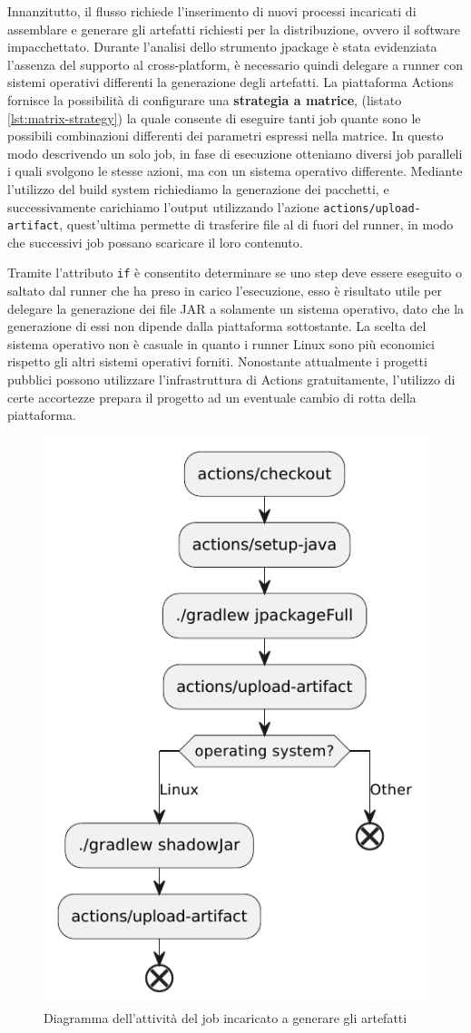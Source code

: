 Innanzitutto, il flusso richiede l'inserimento di nuovi processi incaricati di assemblare e generare gli artefatti richiesti per la distribuzione, ovvero il software impacchettato. Durante l'analisi dello strumento jpackage è stata evidenziata l'assenza del supporto al cross-platform, è necessario quindi delegare a runner con sistemi operativi differenti la generazione degli artefatti. La piattaforma Actions fornisce la possibilità di configurare una \textbf{strategia a matrice}, (listato \ref{lst:matrix-strategy}) la quale consente di eseguire tanti job quante sono le possibili combinazioni differenti dei parametri espressi nella matrice. In questo modo descrivendo un solo job, in fase di esecuzione otteniamo diversi job paralleli i quali svolgono le stesse azioni, ma con un sistema operativo differente. Mediante l'utilizzo del build system richiediamo la generazione dei pacchetti, e successivamente carichiamo l'output utilizzando l'azione \texttt{actions/upload-artifact}, quest'ultima permette di trasferire file al di fuori del runner, in modo che successivi job possano scaricare il loro contenuto. 



Tramite l'attributo \texttt{if} è consentito determinare se uno step deve essere eseguito o saltato dal runner che ha preso in carico l'esecuzione, esso è risultato utile per delegare la generazione dei file JAR a solamente un sistema operativo, dato che la generazione di essi non dipende dalla piattaforma sottostante. La scelta del sistema operativo non è casuale in quanto i runner Linux sono più economici rispetto gli altri sistemi operativi forniti. Nonostante attualmente i progetti pubblici possono utilizzare l'infrastruttura di Actions gratuitamente, l'utilizzo di certe accortezze prepara il progetto ad un eventuale cambio di rotta della piattaforma.

\begin{figure}[htb]
	\centering
	\includegraphics[width=.5\linewidth]{figures/generate-packages-job.pdf}
	\caption{Diagramma dell'attività del job incaricato a generare gli artefatti}
	\label{fig:generate-packages-job}
\end{figure}

